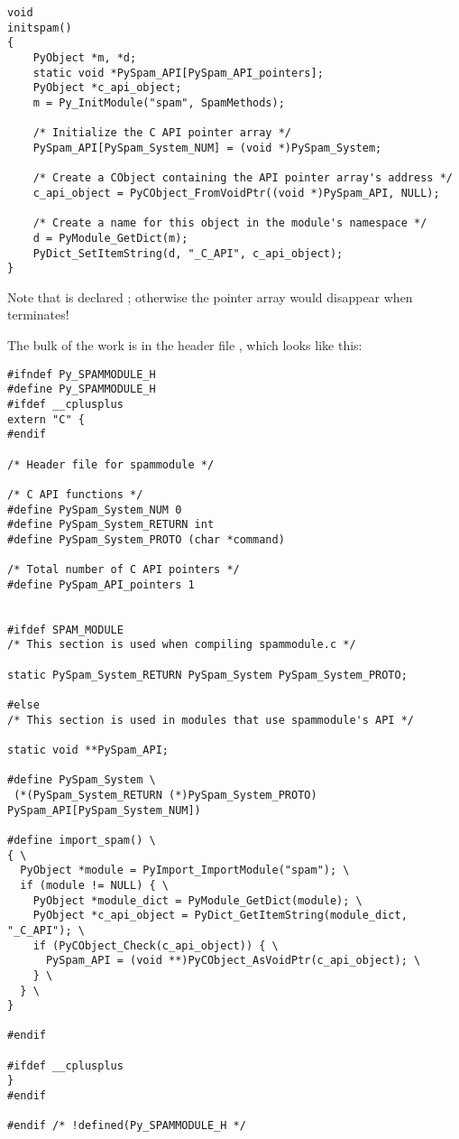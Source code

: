 \documentclass{manual}
\begin{document}
\begin{verbatim}
void
initspam()
{
    PyObject *m, *d;
    static void *PySpam_API[PySpam_API_pointers];
    PyObject *c_api_object;
    m = Py_InitModule("spam", SpamMethods);

    /* Initialize the C API pointer array */
    PySpam_API[PySpam_System_NUM] = (void *)PySpam_System;

    /* Create a CObject containing the API pointer array's address */
    c_api_object = PyCObject_FromVoidPtr((void *)PySpam_API, NULL);

    /* Create a name for this object in the module's namespace */
    d = PyModule_GetDict(m);
    PyDict_SetItemString(d, "_C_API", c_api_object);
}
\end{verbatim}

Note that  is declared ; otherwise
the pointer array would disappear when  terminates!

The bulk of the work is in the header file ,
which looks like this:

\begin{verbatim}
#ifndef Py_SPAMMODULE_H
#define Py_SPAMMODULE_H
#ifdef __cplusplus
extern "C" {
#endif

/* Header file for spammodule */

/* C API functions */
#define PySpam_System_NUM 0
#define PySpam_System_RETURN int
#define PySpam_System_PROTO (char *command)

/* Total number of C API pointers */
#define PySpam_API_pointers 1


#ifdef SPAM_MODULE
/* This section is used when compiling spammodule.c */

static PySpam_System_RETURN PySpam_System PySpam_System_PROTO;

#else
/* This section is used in modules that use spammodule's API */

static void **PySpam_API;

#define PySpam_System \
 (*(PySpam_System_RETURN (*)PySpam_System_PROTO) PySpam_API[PySpam_System_NUM])

#define import_spam() \
{ \
  PyObject *module = PyImport_ImportModule("spam"); \
  if (module != NULL) { \
    PyObject *module_dict = PyModule_GetDict(module); \
    PyObject *c_api_object = PyDict_GetItemString(module_dict, "_C_API"); \
    if (PyCObject_Check(c_api_object)) { \
      PySpam_API = (void **)PyCObject_AsVoidPtr(c_api_object); \
    } \
  } \
}

#endif

#ifdef __cplusplus
}
#endif

#endif /* !defined(Py_SPAMMODULE_H */
\end{verbatim}
\end{document}
